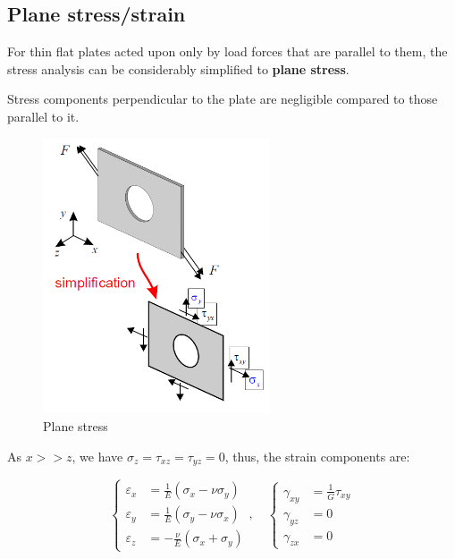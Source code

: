\documentclass[en,hazy,cyan,8pt,normal]{elegantnote}
\numberwithin{equation}{section}
\begin{document}
  \subsection{Plane stress/strain}\label{subsec:03.07}

    For thin flat plates acted upon only by load forces that are parallel to them, the stress analysis can be considerably simplified to \textbf{plane stress}.

    Stress components perpendicular to the plate are negligible compared to those parallel to it.

    \begin{figure}[H]
      \centering
      \includegraphics[width=0.6\textwidth]{image/020.png}
      \caption{Plane stress}
      \label{fig:020}
    \end{figure}

    As $x>>z$, we have $\sigma_z=\tau_{xz}=\tau_{yz}=0$, thus, the strain components are:

    \begin{equation}\label{eq:073}
      \left\{
      \begin{aligned}
        \varepsilon_x &= \frac{1}{E}(\sigma_x - \nu \sigma_y) \\
        \varepsilon_y &= \frac{1}{E}(\sigma_y - \nu \sigma_x) \\
        \varepsilon_z &= -\frac{\nu}{E}(\sigma_x + \sigma_y) 
      \end{aligned}
      \right.
      , \quad
      \left\{
      \begin{aligned}
        \gamma_{xy} &= \frac{1}{G} \tau_{xy}\\
        \gamma_{yz} &= 0 \\
        \gamma_{zx} &= 0
      \end{aligned}
      \right.
    \end{equation}
\end{document}

